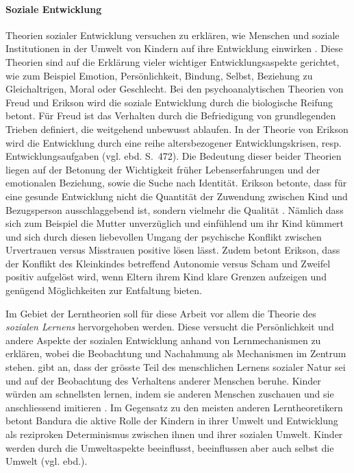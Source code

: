 \paragraph{Soziale Entwicklung}\label{par:SozialeEntwicklung}
Theorien sozialer Entwicklung versuchen zu erklären, wie Menschen und soziale Institutionen in der Umwelt von Kindern auf ihre Entwicklung einwirken \cite[S.~470ff]{Siegler2008}. Diese Theorien sind auf die Erklärung vieler wichtiger Entwicklungsaspekte gerichtet, wie zum Beispiel Emotion, Persönlichkeit, Bindung, Selbst, Beziehung zu Gleichaltrigen, Moral oder Geschlecht. Bei den psychoanalytischen Theorien von Freud und Erikson wird die soziale Entwicklung  durch die biologische Reifung betont. Für Freud ist das Verhalten durch die Befriedigung von grundlegenden Trieben definiert, die weitgehend unbewusst ablaufen. In der Theorie von Erikson wird die Entwicklung durch eine reihe altersbezogener Entwicklungskrisen, resp. Entwicklungsaufgaben  (vgl. ebd. S.~472). Die Bedeutung dieser beider Theorien liegen auf der Betonung der Wichtigkeit früher Lebenserfahrungen und der emotionalen Beziehung, sowie die Suche nach Identität. Erikson betonte, dass für eine gesunde Entwicklung nicht die Quantität der Zuwendung zwischen Kind und Bezugsperson ausschlaggebend ist, sondern vielmehr die Qualität \cite[S.~243]{Berk2011}. Nämlich dass sich zum Beispiel die Mutter unverzüglich und einfühlend um ihr Kind kümmert und sich durch diesen liebevollen Umgang der psychische Konflikt zwischen Urvertrauen versus Misstrauen positive lösen lässt. Zudem betont Erikson, dass der Konflikt des Kleinkindes betreffend Autonomie versus Scham und Zweifel positiv aufgelöst wird, wenn Eltern ihrem Kind klare Grenzen aufzeigen und genügend Möglichkeiten zur Entfaltung bieten. 

Im Gebiet der Lerntheorien soll für diese Arbeit vor allem die Theorie des \textit{sozialen Lernens} hervorgehoben werden. Diese versucht die Persönlichkeit und andere Aspekte der sozialen Entwicklung anhand von Lernmechanismen zu erklären, wobei die Beobachtung und Nachahmung als Mechanismen im Zentrum stehen.  gibt an, dass der grösste Teil des menschlichen Lernens sozialer Natur sei und auf der Beobachtung des Verhaltens anderer Menschen beruhe. Kinder würden am schnellsten lernen, indem sie anderen Menschen zuschauen und sie anschliessend imitieren \cite[S.~482ff]{Siegler2008}. Im Gegensatz zu den meisten anderen Lerntheoretikern betont Bandura die aktive Rolle der Kindern in ihrer Umwelt und Entwicklung als reziproken Determinismus zwischen ihnen und ihrer sozialen Umwelt. Kinder werden durch die Umweltaspekte beeinflusst, beeinflussen aber auch selbst die Umwelt (vgl. ebd.). 

